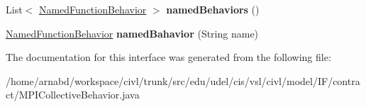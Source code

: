 \begin{DoxyCompactItemize}
\item 
\hypertarget{interfaceedu_1_1udel_1_1cis_1_1vsl_1_1civl_1_1model_1_1IF_1_1contract_1_1MPICollectiveBehavior_aab74939dce7edf64f62c7437f46bc9d4}{}List$<$ \hyperlink{interfaceedu_1_1udel_1_1cis_1_1vsl_1_1civl_1_1model_1_1IF_1_1contract_1_1NamedFunctionBehavior}{Named\+Function\+Behavior} $>$ {\bfseries named\+Behaviors} ()\label{interfaceedu_1_1udel_1_1cis_1_1vsl_1_1civl_1_1model_1_1IF_1_1contract_1_1MPICollectiveBehavior_aab74939dce7edf64f62c7437f46bc9d4}

\item 
\hypertarget{interfaceedu_1_1udel_1_1cis_1_1vsl_1_1civl_1_1model_1_1IF_1_1contract_1_1MPICollectiveBehavior_ae3336a6d4ea9ccffadd78b015cef9a6c}{}\hyperlink{interfaceedu_1_1udel_1_1cis_1_1vsl_1_1civl_1_1model_1_1IF_1_1contract_1_1NamedFunctionBehavior}{Named\+Function\+Behavior} {\bfseries named\+Bahavior} (String name)\label{interfaceedu_1_1udel_1_1cis_1_1vsl_1_1civl_1_1model_1_1IF_1_1contract_1_1MPICollectiveBehavior_ae3336a6d4ea9ccffadd78b015cef9a6c}

\end{DoxyCompactItemize}


The documentation for this interface was generated from the following file\+:\begin{DoxyCompactItemize}
\item 
/home/arnabd/workspace/civl/trunk/src/edu/udel/cis/vsl/civl/model/\+I\+F/contract/M\+P\+I\+Collective\+Behavior.\+java\end{DoxyCompactItemize}
